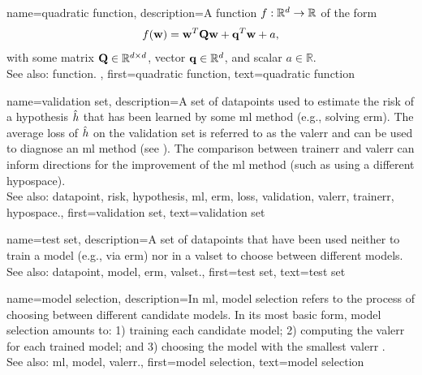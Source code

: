 {name={quadratic function},
	description={A \gls{function} $f: \mathbb{R}^{d} \rightarrow \mathbb{R}$ of the form 
		$$f({\bf w}) =  {\bf w}^{T} \mathbf{Q} \mathbf{w} + \mathbf{q}^{T} {\bf w}+a,$$ with 
		some matrix $\mathbf{Q} \in \mathbb{R}^{d \times d}$, vector ${\bf q} \in \mathbb{R}^{d}$, 
		and scalar $a \in \mathbb{R}$.
		\\
		See also: \gls{function}. },
	first={quadratic function},
	text={quadratic function}  
}

{name={validation set},
 	description={A set of \glspl{datapoint} used to estimate 
  		the \gls{risk} of a \gls{hypothesis} $\hat{h}$ that has been learned by some 
  		\gls{ml} method (e.g., solving \gls{erm}). The average \gls{loss} of $\hat{h}$ 
  		on the \gls{validation} set is referred to as the \gls{valerr} and can be used to diagnose an 
  		\gls{ml} method (see \cite[Sec. 6.6]{MLBasics}). The comparison between \gls{trainerr} 
  		and \gls{valerr} can inform directions for the improvement of the \gls{ml} method (such as 
  		using a different \gls{hypospace}).
			\\
		See also: \gls{datapoint}, \gls{risk}, \gls{hypothesis}, \gls{ml}, \gls{erm}, \gls{loss}, \gls{validation}, \gls{valerr}, \gls{trainerr}, \gls{hypospace}.},
	first={validation set},
	text={validation set}  
}

{name={test set},
	description={A set of \glspl{datapoint} that have  
		been used neither to train a \gls{model} (e.g., via \gls{erm}) nor in a \gls{valset} 
		to choose between different \glspl{model}.
				\\
		See also: \gls{datapoint}, \gls{model}, \gls{erm}, \gls{valset}.},
	first={test set},
	text={test set}  
}


{name={model selection},
	description={In \gls{ml}, \gls{model} selection refers to the 
		process of choosing between different candidate \glspl{model}. In its most 
		basic form, \gls{model} selection amounts to: 1) training each candidate \gls{model}; 
		2) computing the \gls{valerr} for each trained \gls{model}; and 3) choosing the \gls{model} 
		with the smallest \gls{valerr} \cite[Ch. 6]{MLBasics}. 
				\\
		See also: \gls{ml}, \gls{model}, \gls{valerr}.},
	first={model selection},
	text={model selection}  
}


